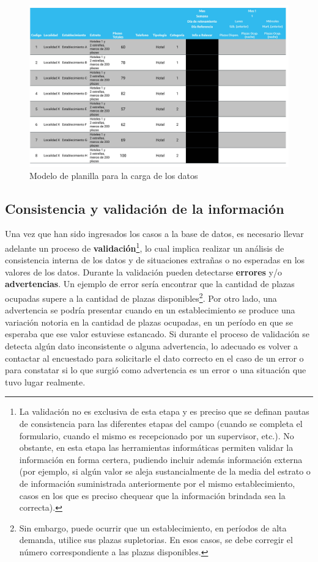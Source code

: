 \documentclass[
]{book}
\begin{document}
\begin{figure}

{\centering \includegraphics[width=0.8\linewidth]{imagenes/tabla_6a} 

}

\caption{Modelo de planilla para la carga de los datos}\label{fig:tabla-6a}
\end{figure}

\hypertarget{consistencia-y-validaciuxf3n-de-la-informaciuxf3n}{%
\subsection{Consistencia y validación de la información}\label{consistencia-y-validaciuxf3n-de-la-informaciuxf3n}}

Una vez que han sido ingresados los casos a la base de datos, es necesario llevar adelante un proceso de \textbf{validación}\footnote{La validación no es exclusiva de esta etapa y es preciso que se definan pautas de consistencia para las diferentes etapas del campo (cuando se completa el formulario, cuando el mismo es recepcionado por un supervisor, etc.). No obstante, en esta etapa las herramientas informáticas permiten validar la información en forma certera, pudiendo incluir además información externa (por ejemplo, si algún valor se aleja sustancialmente de la media del estrato o de información suministrada anteriormente por el mismo establecimiento, casos en los que es preciso chequear que la información brindada sea la correcta).}, lo cual implica realizar un análisis de consistencia interna de los datos y de situaciones extrañas o no esperadas en los valores de los datos. Durante la validación pueden detectarse \textbf{errores} y/o \textbf{advertencias}. Un ejemplo de error sería encontrar que la cantidad de plazas ocupadas supere a la cantidad de plazas disponibles\footnote{Sin embargo, puede ocurrir que un establecimiento, en períodos de alta demanda, utilice sus plazas supletorias. En esos casos, se debe corregir el número correspondiente a las plazas disponibles.}. Por otro lado, una advertencia se podría presentar cuando en un establecimiento se produce una variación notoria en la cantidad de plazas ocupadas, en un período en que se esperaba que ese valor estuviese estancado. Si durante el proceso de validación se detecta algún dato inconsistente o alguna advertencia, lo adecuado es volver a contactar al encuestado para solicitarle el dato correcto en el caso de un error o para constatar si lo que surgió como advertencia es un error o una situación que tuvo lugar realmente.
\end{document}
